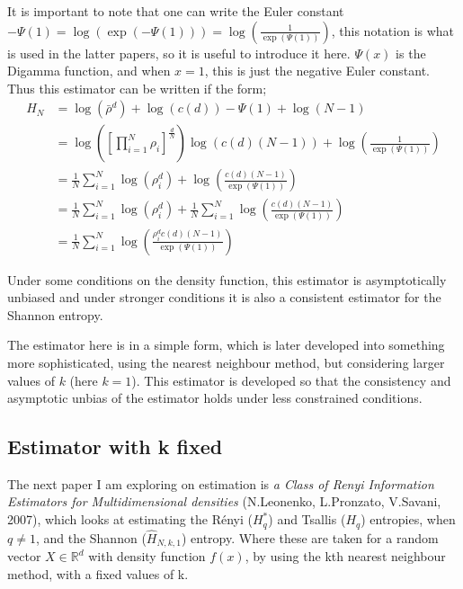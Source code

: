 \documentclass{report}
\begin{document}
It is important to note that one can write the Euler constant $-\Psi(1) = \log (\exp(-\Psi(1))) = \log (\frac{1}{\exp(\Psi(1))})$, this notation is what is used in the latter papers, so it is useful to introduce it here. $\Psi(x)$ is the Digamma function, and when $x=1$, this is just the negative Euler constant. Thus this estimator can be written if the form;
\begin{align}
H_{N} &= \log(\bar{\rho}^{d} ) + \log (c(d)) - \Psi(1)  + \log (N-1) \nonumber \\
&= \log \left( \left[ \prod_{i=1}^{N} \rho_{i} \right]^{\frac{d}{N}} \right) \log( c(d) (N-1)) + \log \left(\frac{1}{\exp(\Psi(1))}\right) \nonumber \\
&= \frac{1}{N} \sum_{i=1}^{N} \log( \rho_{i}^{d} ) + \log \left( \frac{c(d) (N-1)}{ \exp(\Psi(1))} \right) \nonumber \\
&= \frac{1}{N} \sum_{i=1}^{N}\log(\rho_{i}^{d}) + \frac{1}{N} \sum_{i=1}^{N} \log \left( \frac{c(d) (N-1)}{\exp(\Psi(1))}\right) \nonumber \\
&= \frac{1}{N} \sum_{i=1}^{N} \log \left( \frac{\rho_{i}^{d} c(d) (N-1)}{\exp(\Psi(1))}\right) \label{Est_k=1}
\end{align}

Under some conditions on the density function, this estimator is asymptotically unbiased and under stronger conditions it is also a consistent estimator for the Shannon entropy. 

The estimator here is in a simple form, which is later developed into something more sophisticated, using the nearest neighbour method, but considering larger values of $k$ (here $k=1$). This estimator is developed so that the consistency and asymptotic unbias of the estimator holds under less constrained conditions.



\subsection{Estimator with k fixed} \label{fixed_k}

The next paper I am exploring on estimation is \textit{a Class of Renyi Information Estimators for Multidimensional densities} (N.Leonenko, L.Pronzato, V.Savani, 2007), which looks at estimating the R\'enyi ($H_{q}^{*}$) and Tsallis ($H_{q}$) entropies, when $q \neq 1$, and the Shannon ($\hat{H}_{N, k, 1}$) entropy. Where these are taken for a random vector $X \in \mathbb{R}^d$ with density function $f(x)$, by using the kth nearest neighbour method, with a fixed values of k. 
\end{document}
